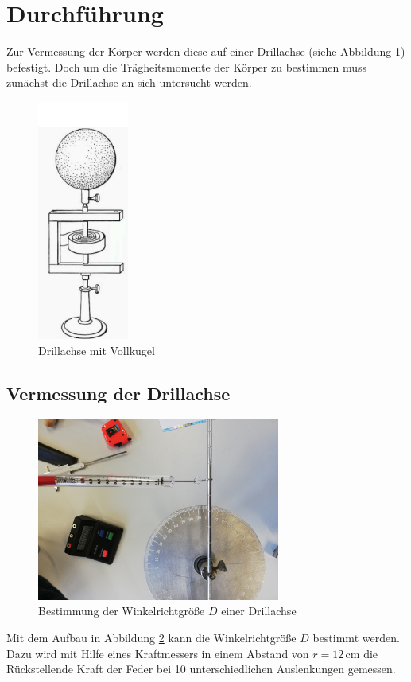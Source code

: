 \section{Durchführung}
\label{sec:Durchführung}
Zur Vermessung der Körper werden diese auf einer 
Drillachse (siehe Abbildung \ref{fig:a}) befestigt.
Doch um die Trägheitsmomente der Körper zu bestimmen
muss zunächst die Drillachse an sich untersucht werden.

\begin{figure}[H]
    \centering
    \includegraphics[width=3cm]{content/Drill.png}
    \caption{Drillachse mit Vollkugel \cite{sample}}
    \label{fig:a}
\end{figure}


\subsection{Vermessung der Drillachse}
\begin{figure}[H]
    \centering
    \includegraphics[width=8cm]{content/1.jpg}
    \caption{Bestimmung der Winkelrichtgröße $D$ einer Drillachse}
    \label{fig:b}
\end{figure}

\noindent Mit dem Aufbau in Abbildung \ref{fig:b}
kann die Winkelrichtgröße $D$ bestimmt werden. Dazu wird
mit Hilfe eines Kraftmessers  in einem Abstand
von $r=12\,\si{\centi\meter}$ die Rückstellende Kraft 
der Feder bei 10 unterschiedlichen Auslenkungen gemessen.

